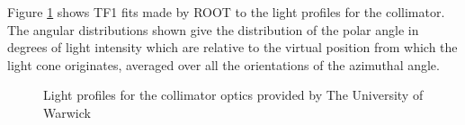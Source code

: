 Figure \ref{fig:collimator_TF1} shows TF1 fits made by ROOT to the light profiles for the collimator. The angular distributions shown give the distribution of the polar angle in degrees of light intensity which are relative to the virtual position from which the light cone originates, averaged over all the orientations of the azimuthal angle. 

\begin{figure}[!htbp]
    \centering
    
    \caption{Light profiles for the collimator optics provided by The University of Warwick}\label{fig:collimator_TF1}
    
    \hfill
    \hfill
    
    \hspace*{0.005\textwidth}%
    
\end{figure}

